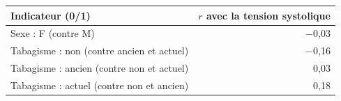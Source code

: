 \begin{tabular}{lr}
\toprule
Indicateur (0/1) & $r$ avec la tension systolique \\
\midrule
Sexe : F (contre M) & $-$0,03 \\
Tabagisme : non (contre ancien et actuel) & $-$0,16 \\
Tabagisme : ancien (contre non et actuel) & 0,03 \\
Tabagisme : actuel (contre non et ancien) & 0,18 \\
\bottomrule
\end{tabular}
